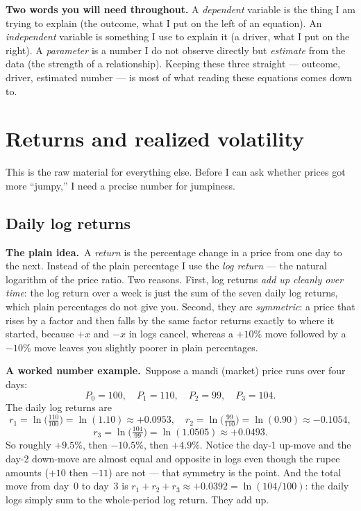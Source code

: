 \documentclass[11pt]{article}
\newcommand{\intuit}{\smallskip\noindent\textbf{The plain idea.}\ }
\newcommand{\example}{\smallskip\noindent\textbf{A worked number example.}\ }
\begin{document}
\bigskip
\noindent\textbf{Two words you will need throughout.} A \emph{dependent} variable is the thing
I am trying to explain (the outcome, what I put on the left of an equation). An
\emph{independent} variable is something I use to explain it (a driver, what I put on the right).
A \emph{parameter} is a number I do not observe directly but \emph{estimate} from the data (the
strength of a relationship). Keeping these three straight --- outcome, driver, estimated number
--- is most of what reading these equations comes down to.

\section{Returns and realized volatility}

This is the raw material for everything else. Before I can ask whether prices got more
``jumpy,'' I need a precise number for jumpiness.

\subsection{Daily log returns}

\intuit A \emph{return} is the percentage change in a price from one day to the next. Instead of
the plain percentage I use the \emph{log return} --- the natural logarithm of the price ratio.
Two reasons. First, log returns \emph{add up cleanly over time}: the log return over a week is
just the sum of the seven daily log returns, which plain percentages do not give you. Second,
they are \emph{symmetric}: a price that rises by a factor and then falls by the same factor
returns exactly to where it started, because $+x$ and $-x$ in logs cancel, whereas a $+10\%$
move followed by a $-10\%$ move leaves you slightly poorer in plain percentages.

\example Suppose a mandi (market) price runs over four days:
\[
P_0 = 100,\quad P_1 = 110,\quad P_2 = 99,\quad P_3 = 104.
\]
The daily log returns are
\[
r_1 = \ln\!\Big(\tfrac{110}{100}\Big) = \ln(1.10) \approx +0.0953,\quad
r_2 = \ln\!\Big(\tfrac{99}{110}\Big) = \ln(0.90) \approx -0.1054,
\]
\[
r_3 = \ln\!\Big(\tfrac{104}{99}\Big) = \ln(1.0505) \approx +0.0493.
\]
So roughly $+9.5\%$, then $-10.5\%$, then $+4.9\%$. Notice the day-1 up-move and the day-2
down-move are almost equal and opposite in logs even though the rupee amounts ($+10$ then $-11$)
are not --- that symmetry is the point. And the total move from day~0 to day~3 is
$r_1+r_2+r_3 \approx +0.0392 = \ln(104/100)$: the daily logs simply sum to the whole-period log
return. They add up.
\end{document}
